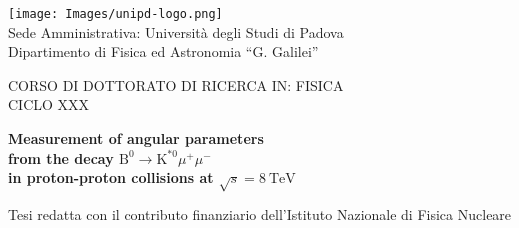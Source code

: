 \begin{titlepage}
  {\center\texttt{[image: Images/unipd-logo.png]}\\[1cm]}
  {\large Sede Amministrativa: Universit\`{a} degli Studi di Padova}\\

  {\large Dipartimento di Fisica ed Astronomia ``G. Galilei''}\\

  \vspace{1 cm}
  
  {\large CORSO DI DOTTORATO DI RICERCA IN: FISICA}\\

  {\large CICLO XXX}\\

  \vspace{1 cm}
  
  {\Large \center \bfseries Measurement of angular parameters\\from the decay $\mathrm{B}^0 \to \mathrm{K}^{*0} \mu^+ \mu^-$\\in proton-proton collisions at $\sqrt{s}=8~\mathrm{TeV}$}\\%

  \vspace{1cm}

  {\small Tesi redatta con il contributo finanziario dell'Istituto Nazionale di Fisica Nucleare}\\


\end{titlepage}
